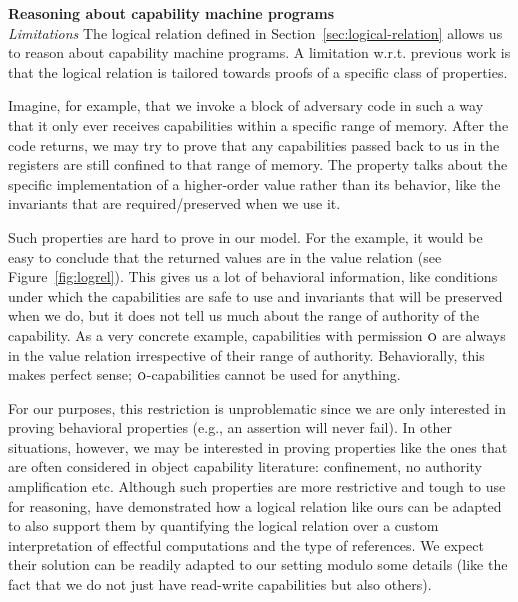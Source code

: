\documentclass[format=acmsmall, review=true, screen=true]{acmart}
\renewcommand{\figurename}{Figure}
\renewcommand{\sectionname}{Section}
\newcommand{\plainperm}[1]{\textsc{#1}}
\newcommand{\noperm}{\plainperm{o}}
\newenvironment{toplas}{}{}
\begin{document}
\begin{toplas}
\noindent \textbf{Reasoning about capability machine programs}\\
\emph{Limitations} The logical relation defined in
\sectionname~\ref{sec:logical-relation} allows us to reason about capability machine
programs. A limitation w.r.t. previous work is that the logical relation is
tailored towards proofs of a specific class of properties.

Imagine, for example, that we invoke a block of adversary code in such a way
that it only ever receives capabilities within a specific range of memory. After
the code returns, we may try to prove that any capabilities passed back to us in
the registers are still confined to that range of memory. The property talks
about the specific implementation of a higher-order value rather than its behavior,
like the invariants that are required/preserved when we use it.

Such properties are hard to prove in our model.
For the example, it would be easy to conclude that the returned values are in the value relation (see \figurename~\ref{fig:logrel}).
This gives us a lot of behavioral information, like conditions under which the capabilities are safe to use and invariants that will be preserved when we do, but it does not tell us much about the range of authority of the capability.
As a very concrete example, capabilities with permission $\noperm$ are always in the value relation irrespective of their range of authority.
Behaviorally, this makes perfect sense; $\noperm$-capabilities cannot be used
for anything.

For our purposes, this restriction is unproblematic since we are only interested in proving behavioral properties (e.g., an assertion will never fail).
In other situations, however, we may be interested in proving properties like the ones that are often considered in object capability literature: confinement, no authority amplification etc.
Although such properties are more restrictive and tough to use for reasoning, \citet{Devriese:2016ObjCap} have demonstrated how a logical relation like ours can be adapted to also support them by quantifying the logical relation over a custom interpretation of effectful computations and the type of references.
We expect their solution can be readily adapted to our setting modulo some details (like the fact that we do not just have read-write capabilities but also others).
\end{toplas}
\\\\
\end{document}

